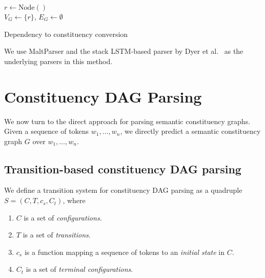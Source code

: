 \documentclass[11pt]{article}
\begin{document}
\begin{algorithm}
 $r \leftarrow \mathrm{Node()}$\\
 $V_G \leftarrow \{r\}$,
 $E_G \leftarrow \emptyset$\\
 \caption{Dependency to constituency conversion}
 \label{alg:dep2con}
\end{algorithm}

We use MaltParser \cite{nivre2007maltparser} and the stack LSTM-based parser by Dyer et al.~ as the underlying parsers in this method.

\section{Constituency DAG Parsing}\label{sec:direct_approach}

We now turn to the direct approach for parsing semantic constituency graphs. Given a sequence of tokens $w_1, \ldots, w_n$, we directly predict a semantic constituency graph $G$ over $w_1, \ldots, w_n$.

\subsection{Transition-based constituency DAG parsing}

We define a transition system for constituency DAG parsing as a quadruple $S=(C,T,c_s,C_t)$, where
\begin{enumerate}
 \item $C$ is a set of \textit{configurations}.
 \item $T$ is a set of \textit{transitions}.
 \item $c_s$ is a function mapping a sequence of tokens to an \textit{initial state} in $C$.
 \item $C_t$ is a set of \textit{terminal configurations}.
\end{enumerate}
\end{document}
